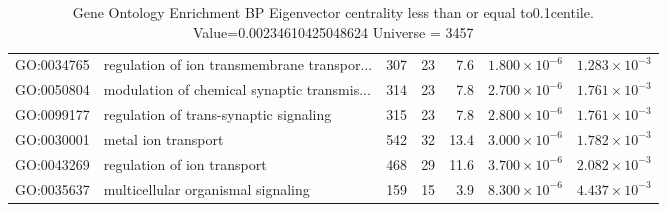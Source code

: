 \begin{table}[ht]
\begin{adjustbox}{width=\textwidth}
\begin{tabular}{llrrrrr}
  GO:0034765 & regulation of ion transmembrane transpor... & 307 & 23 & 7.6 & $1.800 \times 10^{-6}$ & $1.283 \times 10^{-3}$ \\ 
  GO:0050804 & modulation of chemical synaptic transmis... & 314 & 23 & 7.8 & $2.700 \times 10^{-6}$ & $1.761 \times 10^{-3}$ \\ 
  GO:0099177 & regulation of trans-synaptic signaling & 315 & 23 & 7.8 & $2.800 \times 10^{-6}$ & $1.761 \times 10^{-3}$ \\ 
  GO:0030001 & metal ion transport & 542 & 32 & 13.4 & $3.000 \times 10^{-6}$ & $1.782 \times 10^{-3}$ \\ 
  GO:0043269 & regulation of ion transport & 468 & 29 & 11.6 & $3.700 \times 10^{-6}$ & $2.082 \times 10^{-3}$ \\ 
  GO:0035637 & multicellular organismal signaling & 159 & 15 & 3.9 & $8.300 \times 10^{-6}$ & $4.437 \times 10^{-3}$ \\ 
   \hline
\end{tabular}
\end{adjustbox}
\caption{Gene Ontology Enrichment BP Eigenvector centrality  less than or equal to0.1centile.   Value=0.00234610425048624 Universe = 3457} 
\label{tab:Gene Ontology Enrichment BP Eigenvector centrality  less than or equal to0.1centile.   Value=0.00234610425048624 Universe = 3457}
\end{table}

